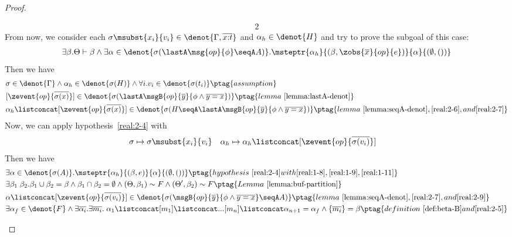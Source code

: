 \begin{proof}
\begin{enumerate}[label=Case]
{\begin{alignat}{2}
\end{alignat}}\noindent
From now, we consider each $\sigma\msubst{x_i}{v_i} \in \denot{\Gamma, \overline{x{:}t}}$ and $\alpha_h \in \denot{H}$ and try to prove the subgoal of this case: 
{\footnotesize\begin{align*}
    \exists \beta. \Theta \vdash \beta \land \exists \alpha \in\denot{\sigma(\lastA\msg{op}{\phi} \seqA A)}. \msteptr{\alpha_h}{(\beta, \zobs{\overline{x}}{op}{e})}{\alpha}{(\emptyset, ())}
\end{align*}}\noindent
Then we have
{\footnotesize\begin{alignat}{2}
&\sigma \in \denot{\Gamma} \land \alpha_h \in \denot{\sigma(H)}  \land \forall i. v_i \in\denot{\sigma(t_i)} \ptag{assumption} \label{real:2-6}
\\& [\zevent{op}{\overline{\sigma(x)}}] \in \denot{\sigma(\lastA\msgB{op}{\overline{y}}{\phi \land \overline{y = x}})} \ptag{lemma~\ref{lemma:lastA-denot}} \label{real:2-7}
\\& \alpha_h \listconcat [\zevent{op}{\overline{\sigma(x)}}] \in \denot{\sigma(H \seqA \lastA\msgB{op}{\overline{y}}{\phi \land \overline{y = x}})} \ptag{lemma~\ref{lemma:seqA-denot}, \ref{real:2-6}, and \ref{real:2-7}} \label{real:2-8}
\end{alignat}}\noindent
Now, we can apply hypothesis~\ref{real:2-4} with
{\footnotesize\begin{align*}
    &\sigma \mapsto \sigma\msubst{x_i}{v_i} \quad \alpha_h \mapsto \alpha_h \listconcat [\zevent{op}{\overline{\sigma(v_i)}}]
\end{align*}}\noindent
Then we have
{\footnotesize\begin{alignat}{2}
&\exists \alpha \in\denot{\sigma(A)}. \msteptr{\alpha_h}{(\beta, e)}{\alpha}{(\emptyset, ())} \ptag{hypothesis~\ref{real:2-4} with \ref{real:1-8}, \ref{real:1-9}, \ref{real:1-11}} \label{real:2-9}
\\& \exists \beta_1\;\beta_2. \beta_1 \cup \beta_2 = \beta \land \beta_1 \cap \beta_2 = \emptyset \land (\Theta, \beta_1) \sim F \land (\Theta', \beta_2) \sim F \ptag{Lemma~\ref{lemma:buf-partition}} \label{real:2-10}
\\& \alpha \listconcat [\zevent{op}{\overline{\sigma(v_i)}}] \in \denot{\sigma(\msgB{op}{\overline{y}}{\phi \land \overline{y = x}} \seqA A)} \ptag{lemma~\ref{lemma:seqA-denot}, \ref{real:2-7}, and \ref{real:2-9}} \label{real:2-11}
\\&\exists \alpha_f \in \denot{F} \land \exists \overline{\alpha_i}. \exists \overline{m_i}.\; \alpha_1 \listconcat [m_1] \listconcat ... [m_{n}] \listconcat \alpha_{n+1} = \alpha_f \land \{\overline{m_i}\} = \beta \ptag{definition~\ref{def:beta-B} and \ref{real:2-5}} \label{real:2-12}

\end{alignat}}
\end{enumerate}
\end{proof}
